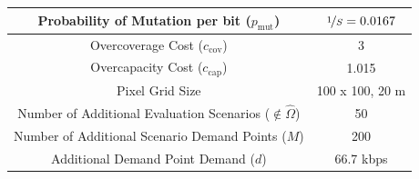 \documentclass[12pt,dvipsnames]{report}
\begin{document}
\begin{table}[!htp]
\begin{tabular}{|c|c|}
		\hline
		Probability of Mutation per bit ($p_\text{mut}$) & $\nicefrac{1}{S} = 0.0167$ \\
		\hline 
		Overcoverage Cost ($c_\text{cov}$) & 3 \\
		\hline
		Overcapacity Cost ($c_\text{cap}$) & 1.015 \\ 
		\hline
		Pixel Grid Size & 100 x 100, 20 m \\
		\hline
		\hline
		Number of Additional Evaluation Scenarios ($\not\in \hat{\Omega}$) & 50 \\
		\hline
		Number of Additional Scenario Demand Points ($M$) & 200 \\
		\hline
		Additional Demand Point Demand ($d$) & 66.7 kbps \\
		\hline
	\end{tabular}
	\label{tab:Prelim_SimVal}
\end{table}
\end{document}
